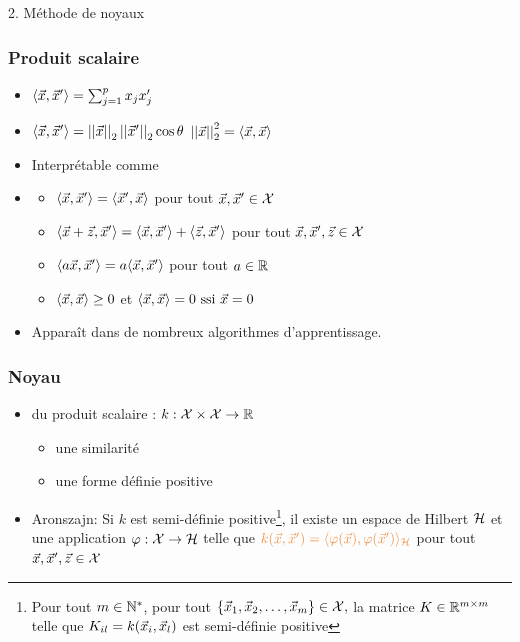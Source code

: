 \begin{frame}
  \begin{center}
    \large{2. Méthode de noyaux}
  \end{center}
\end{frame}


\begin{frame}
  \frametitle{Produit scalaire}
  \begin{itemize}
  \item $\langle \vec{x}, \vec{x}^\prime \rangle = \sum_{j=1}^p x_j x_j^\prime$
  \item $\langle \vec{x}, \vec{x}^\prime \rangle = \left|\left|\vec{x}\right|\right|_2 \left|\left|\vec{x}^\prime\right|\right|_2 \cos \theta$ \hspace{1em}
     $\left|\left|\vec{x}\right|\right|_2^2 = \langle \vec{x}, \vec{x} \rangle$
  \item Interprétable comme 
  \item {}
    \begin{itemize}
    \item $\langle \vec{x}, \vec{x}^\prime \rangle = \langle \vec{x}^\prime, \vec{x} \rangle$
      pour tout $\vec{x}, \vec{x}^\prime \in \mathcal{X}$
    \item $\langle \vec{x} + \vec{z}, \vec{x}^\prime \rangle = \langle \vec{x}, \vec{x}^\prime \rangle +
      \langle \vec{z}, \vec{x}^\prime \rangle$       pour tout $\vec{x}, \vec{x}^\prime, \vec{z} \in \mathcal{X}$
    \item $\langle a \vec{x}, \vec{x}^\prime \rangle = a \langle \vec{x}, \vec{x}^\prime \rangle$ pour tout $a \in {\mathbb R}$
    \item $\langle \vec{x}, \vec{x} \rangle \geq 0$ et $\langle \vec{x}, \vec{x} \rangle = 0 \text{ ssi } \vec{x} = 0$
    \end{itemize}
  \item Apparaît dans de nombreux algorithmes d'apprentissage.
  \end{itemize}
\end{frame}

\begin{frame}
  \frametitle{Noyau}
  \begin{itemize}
  \item {} du produit scalaire : $k: \mathcal{X} \times \mathcal{X} \rightarrow {\mathbb R}$
    \begin{itemize}
    \item {} une similarité
    \item {} une forme définie positive 
    \end{itemize}
  \item Aronszajn: Si $k$ est semi-définie positive\footnote{Pour tout
      $m \in {\mathbb N}^*$, pour tout
      $\{\vec{x}_1, \vec{x}_2, \dots, \vec{x}_m\} \in \mathcal{X},$ la matrice
      $K \in {\mathbb R}^{m \times m}$ telle que $K_{il} = k(\vec{x}_i, \vec{x}_l)$ est
      semi-définie positive}, il existe un espace de Hilbert $\mathcal{H}$ et une application
    $\varphi: \mathcal{X} \rightarrow \mathcal{H}$ telle que
    $\textcolor{MyOrange}{k(\xvec, \xvec^\prime) = \langle \varphi(\xvec), \varphi(\xvec^\prime)\rangle_{\hcal}}$
    pour tout $\vec{x}, \vec{x}^\prime, \vec{z} \in \mathcal{X}$
  \end{itemize}
\end{frame}

